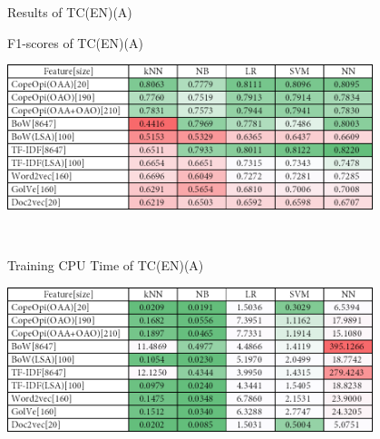 \caption{Results of TC(EN)(A)}
\label{tab:tc_en_a}
\centering
\begin{subtable}{\textwidth}
	\centering
	\caption{F1-scores of TC(EN)(A)}
	\includegraphics[width=0.8\textwidth]{./figure/01B1.png}
\end{subtable}\\[1em]
\begin{subtable}{\textwidth}
	\centering
	\caption{Training CPU Time of TC(EN)(A)}
	\includegraphics[width=0.8\textwidth]{./figure/01B1t.png}
\end{subtable}
